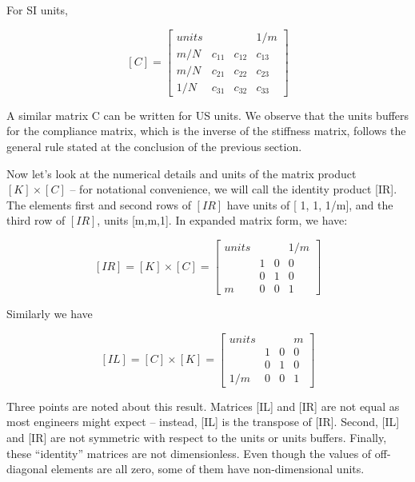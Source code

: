 \noindent
For SI units,

\[ [C] =  \left [
\begin{array}{rrrr}
units & \;      & \;     &  1/m \\
 m/N  &  c_{11} & c_{12} & c_{13} \\
 m/N  &  c_{21} & c_{22} & c_{23} \\
 1/N  &  c_{31} & c_{32} & c_{33}
\end{array}
\right] 
 \]

\vspace{0.15 in}\noindent
A similar matrix C can be written for US units.
We observe that the units buffers for the compliance matrix,
which is the inverse of the stiffness matrix,
follows the general rule stated at
the conclusion of the previous section.

\vspace{0.15 in}
\noindent\hspace{0.5 in}
Now let's look at the numerical details and units of
the matrix product $[K] \times [C]$ -- for notational convenience,
we will call the identity product [IR]. 
The elements first and second rows of $[IR]$ have
units of [ 1, 1, 1/m], and the third row of $[IR]$, units [m,m,1].
In expanded matrix form, we have:

\[ [IR] = [K]\times [C] = \left [
\begin{array}{rrrr}
units  & \;& \;& 1/m \\
\; & 1 & 0 & 0 \\
\; & 0 & 1 & 0 \\
 m & 0 & 0 & 1
\end{array}
\right]
 \]

\vspace{0.15 in}\noindent
Similarly we have

\[ [IL] = [C]\times [K] = \left [
\begin{array}{rrrr}
units  & \;& \;& m \\
\;  & 1 & 0 & 0 \\
\;  & 0 & 1 & 0 \\
1/m & 0 & 0 & 1
\end{array}
\right]
 \]

\vspace{0.15 in}\noindent
Three points are noted about this result.
Matrices [IL] and [IR] are not equal as most engineers might expect --
instead, [IL] is the transpose of [IR].
Second, [IL] and [IR] are not symmetric with respect
to the units or units buffers.
Finally, these ``identity'' matrices are not dimensionless.
Even though the values of off-diagonal elements are all zero,
some of them have non-dimensional units.

